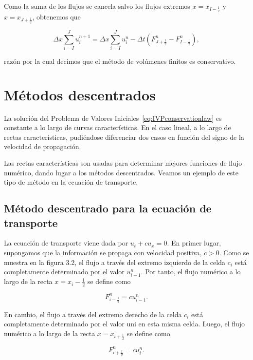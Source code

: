 Como la suma de los flujos se cancela salvo los flujos extremos
$x=x_{I-\frac{1}{2}}$ y $x=x_{J+\frac{1}{2}}$, obtenemos que

\begin{equation}\label{eq:conservative}
  \Delta x
  \sum_{i=I}^{J}
  u^{n+1}_{i}=
  \Delta x
  \sum_{i=I}^{J}
  u^{n}_{i}-
  \Delta t
  \left(
  F^{n}_{J+\frac{1}{2}}-
  F^{n}_{I-\frac{1}{2}}
  \right),
\end{equation}

razón por la cual decimos que el método de volúmenes finitos es
conservativo.

\section{Métodos descentrados}

La solución del Problema de Valores
Iniciales~\eqref{eq:IVPconservationlaw} es constante a lo largo de
curvas características.
En el caso lineal, a lo largo de rectas características, pudiéndose
diferenciar dos casos en función del signo de la velocidad de
propagación. %


Las rectas características son usadas para determinar mejores
funciones de flujo numérico, dando lugar a los métodos descentrados.
Veamos un ejemplo de este tipo de método en la ecuación de
transporte.

\subsection*{Método descentrado para la ecuación de transporte}

La ecuación de transporte viene dada por $u_{t}+cu_{x}=0$.
En primer lugar, supongamos que la información se propaga con
velocidad positiva, $c>0$.
Como se muestra en la figura 3.2, el flujo a través del extremo
izquierdo de la celda $c_{i}$ está completamente determinado por el
valor $u^{n}_{i-1}$.
Por tanto, el flujo numérico a lo largo de la recta
$x=x_{i}-\frac{1}{2}$ se define como

\begin{equation*}
  F^{n}_{i-\frac{1}{2}}=
  cu^{n}_{i-1}.
\end{equation*}

En cambio, el flujo a través del extremo derecho de la celda $c_{i}$
está completamente determinado por el valor uni en esta misma celda.
Luego, el flujo numérico a lo largo de la recta $x=x_{i+\frac{1}{2}}$
se define como

\begin{equation*}
  F^{n}_{i+\frac{1}{2}}=
  cu^{n}_{i}.
\end{equation*}

